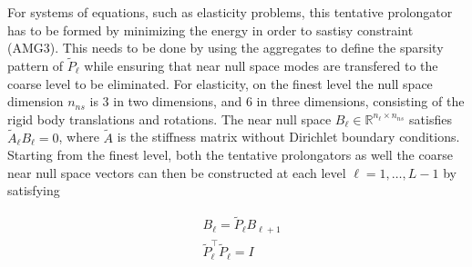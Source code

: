For systems of equations, such as elasticity problems, this tentative prolongator has to be formed by minimizing the energy in order to sastisy constraint (AMG3). This needs to be done by using the aggregates to define the sparsity pattern of $\tilde{P}_\ell$ while ensuring that near null space modes are transfered to the coarse level to be eliminated. For elasticity, on the finest level the null space dimension $n_{ns}$ is 3 in two dimensions, and 6 in three dimensions, consisting of the rigid body translations and rotations. The near null space $B_\ell \in \mathbb{R}^{n_\ell \times n_{ns}}$ satisfies $\tilde{A}_\ell B_\ell = 0$, where $\tilde{A}$ is the stiffness matrix without Dirichlet boundary conditions. Starting from the finest level, both the tentative prolongators as well the coarse near null space vectors can then be constructed at each level $\ell = 1, \ldots, L - 1$ by satisfying

\begin{equation}
	\label{eq:prolongator_req}
	\begin{aligned}
	& B_\ell = \tilde{P}_\ell B_{\ell+1} \\
	& \tilde{P}_\ell^\top \tilde{P}_\ell = I
	\end{aligned}
\end{equation}

